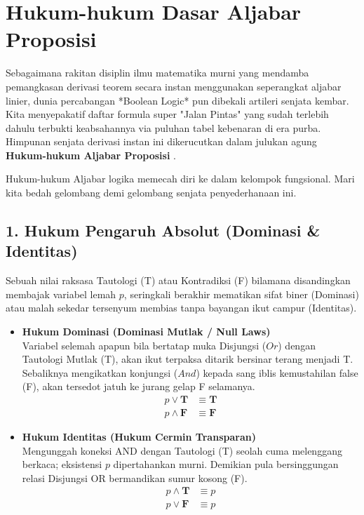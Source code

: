 \section{Hukum-hukum Dasar Aljabar Proposisi}

Sebagaimana rakitan disiplin ilmu matematika murni yang mendamba pemangkasan derivasi teorem secara instan menggunakan seperangkat aljabar linier, dunia percabangan *Boolean Logic* pun dibekali artileri senjata kembar. Kita menyepakatif daftar formula super "Jalan Pintas" yang sudah terlebih dahulu terbukti keabsahannya via puluhan tabel kebenaran di era purba. Himpunan senjata derivasi instan ini dikerucutkan dalam julukan agung \textbf{Hukum-hukum Aljabar Proposisi} \cite{rosen2019}.

Hukum-hukum Aljabar logika memecah diri ke dalam kelompok fungsional. Mari kita bedah gelombang demi gelombang senjata penyederhanaan ini.

\subsection{1. Hukum Pengaruh Absolut (Dominasi \& Identitas)}
Sebuah nilai raksasa Tautologi (T) atau Kontradiksi (F) bilamana disandingkan membajak variabel lemah $p$, seringkali berakhir mematikan sifat biner (Dominasi) atau malah sekedar tersenyum membias tanpa bayangan ikut campur (Identitas).

\begin{itemize}
    \item \textbf{Hukum Dominasi (Dominasi Mutlak / Null Laws)} \\
    Variabel selemah apapun bila bertatap muka Disjungsi ($Or$) dengan Tautologi Mutlak (T), akan ikut terpaksa ditarik bersinar terang menjadi T. \\ Sebaliknya mengikatkan konjungsi ($And$) kepada sang iblis kemustahilan false (F), akan tersedot jatuh ke jurang gelap F selamanya.
    \begin{align*}
        p \vee \mathbf{T} &\equiv \mathbf{T} \\
        p \wedge \mathbf{F} &\equiv \mathbf{F}
    \end{align*}

    \item \textbf{Hukum Identitas (Hukum Cermin Transparan)} \\
    Mengunggah koneksi AND dengan Tautologi (T) seolah cuma melenggang berkaca; eksistensi $p$ dipertahankan murni. Demikian pula bersinggungan relasi Disjungsi OR bermandikan sumur kosong (F).
    \begin{align*}
        p \wedge \mathbf{T} &\equiv p \\
        p \vee \mathbf{F} &\equiv p
    \end{align*}
\end{itemize}

